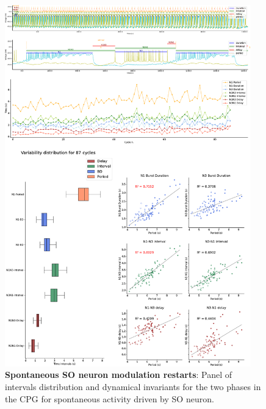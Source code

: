 \begin{figure}[htbp]
	\centering
	\includegraphics[width=0.95\textwidth]{./img/invariants/data/SUSSEX/prep4_so_driven_2/images/panel_with_intervals.pdf}
	\caption{\textbf{Spontaneous SO neuron modulation restarts}: Panel of intervals distribution and dynamical invariants for the two phases in the CPG for spontaneous activity driven by SO neuron.}
	\label{fig:so spontaneous invariants 1}
\end{figure}


